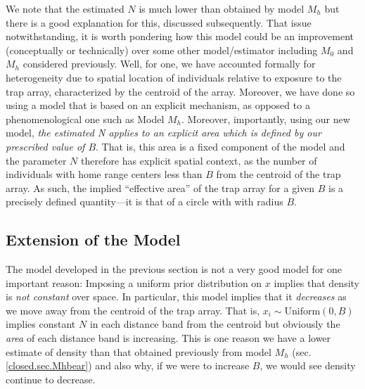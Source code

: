We note that 
the estimated $N$ is much lower than obtained by model
$M_h$ but there is a good explanation for this, discussed
subsequently. That issue notwithstanding, it is worth pondering how
this model could be an improvement (conceptually or technically) over
some other model/estimator including $M_0$ and $M_h$ considered
previously. Well, for one, we have accounted formally for
heterogeneity due to spatial location of individuals relative to
exposure to the trap array, characterized by the centroid of the
array. Moreover, we have done so using a model that is based on an
explicit mechanism, as opposed to a phenomenological one such as Model
$M_h$. Moreover, importantly, using our new model, {\it the estimated N
  applies to an explicit area which is defined by our prescribed value
  of $B$}. That is, this area is a fixed component of the model and
the parameter $N$ therefore has explicit spatial context, as the number
of individuals with home range centers less than $B$ from the
centroid of the trap array. As such, the implied ``effective
area'' of the trap array for a given $B$ is a precisely defined
quantity---it is that of a circle with with radius
$B$.


\subsection{Extension of the Model}

The model developed in the previous section
 is  not a very good model for one important reason:
Imposing a uniform prior distribution on $x$ implies that density is
{\it not constant} over space. In particular, this model implies that
it {\it decreases} as we move away from the centroid of the trap
array.  That is, $x_{i} \sim \mbox{Uniform}(0,B)$ implies constant
$N$ in each distance band from the centroid but obviously the {\it
  area} of each distance band is increasing.  This is one reason we
have a lower estimate of density than that obtained previously from
model $M_h$ (sec. \ref{closed.sec.Mhbear})
and also why, if we were to increase $B$, we would
see density continue to decrease.


